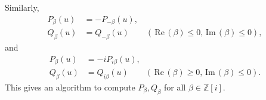 \documentclass[11pt,a4paper]{article}
\newcommand{\Z}{\mathbb{Z}}
\newcommand{\re}{\,\mathrm{Re}\,}
\newcommand{\im}{\,\mathrm{Im}\,}
\begin{document}
Similarly,
\begin{align*}
P_\beta(u) &=  - P_{-\beta}(u),\\
Q_\beta(u) &= Q_{- \beta}(u) \qquad (\re(\beta)\leq 0, \im(\beta)\leq 0),
\end{align*}
and
\begin{align*}
P_\beta(u) &=  - iP_{i \beta}(u),\\
Q_\beta(u) &= Q_{i\beta}(u) \qquad (\re(\beta)\geq 0, \im(\beta)\leq 0).
\end{align*}
This gives an algorithm to compute $P_\beta, Q_\beta$ for all $\beta \in \Z[i]$.
\end{document}
